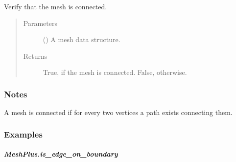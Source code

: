 \documentclass[letterpaper,10pt,english]{sphinxmanual}
\begin{document}
\begin{fulllineitems}
\begin{fulllineitems}
\label{\detokenize{api/generated/directional_clustering.mesh.MeshPlus.is_connected:directional_clustering.mesh.MeshPlus.is_connected}}
Verify that the mesh is connected.
\begin{quote}\begin{description}
\item[{Parameters}] \leavevmode
{} () \textendash{} A mesh data structure.

\item[{Returns}] \leavevmode
{} \textendash{} True, if the mesh is connected.
False, otherwise.

\end{description}\end{quote}
\subsubsection*{Notes}

A mesh is connected if for every two vertices a path exists connecting them.
\subsubsection*{Examples}

\begin{sphinxVerbatim}[commandchars=\\\{\}]
\end{sphinxVerbatim}

\end{fulllineitems}



\subparagraph{MeshPlus.is\_edge\_on\_boundary}
\label{\detokenize{api/generated/directional_clustering.mesh.MeshPlus.is_edge_on_boundary:meshplus-is-edge-on-boundary}}\label{\detokenize{api/generated/directional_clustering.mesh.MeshPlus.is_edge_on_boundary::doc}}


\end{fulllineitems}
\end{document}
